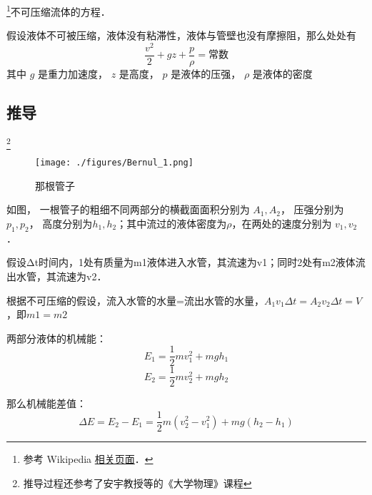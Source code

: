
\begin{issues}
\issueDraft
\end{issues}

\footnote{参考 Wikipedia \href{https://en.wikipedia.org/wiki/Bernoulli-principle}{相关页面}．}不可压缩流体的方程．

假设液体不可被压缩，液体没有粘滞性，液体与管壁也没有摩擦阻，那么处处有
\begin{equation}
\frac{v^2}{2} + gz + \frac{p}{\rho} = \text{常数}
\end{equation}
其中 $g$ 是重力加速度， $z$ 是高度， $p$ 是液体的压强， $\rho$ 是液体的密度

\subsection{推导}
\footnote{推导过程还参考了安宇教授等的《大学物理》课程}
\begin{figure}[ht]
\centering
\texttt{[image: ./figures/Bernul\_1.png]}
\caption{那根管子} \label{Bernul_fig1}
\end{figure}
如图， 一根管子的粗细不同两部分的横截面面积分别为 $A_1, A_2$， 压强分别为 $p_1, p_2$， 高度分别为$h_1, h_2$；其中流过的液体密度为$\rho$，在两处的速度分别为 $v_1, v_2$．

假设Δt时间内，1处有质量为m1液体进入水管，其流速为v1；同时2处有m2液体流出水管，其流速为v2．

根据不可压缩的假设，流入水管的水量=流出水管的水量，$A_1v_1\Delta t=A_2v_2\Delta t=V$，即$m1=m2$

两部分液体的机械能：
\begin{equation}
E_1=\frac{1}{2}mv_1^2+mgh_1
\end{equation}
\begin{equation}
E_2=\frac{1}{2}mv_2^2+mgh_2
\end{equation}

那么机械能差值：
\begin{equation}
\Delta E = E_2 - E_1 = \frac{1}{2}m(v_2^2-v_1^2)+mg(h_2-h_1)
\end{equation}

